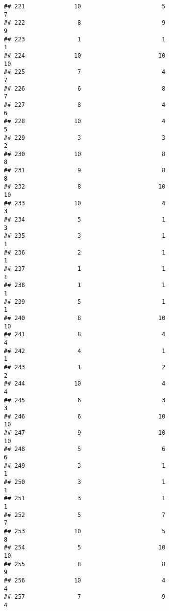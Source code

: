 \documentclass[
]{article}
\begin{document}
\begin{verbatim}
## 221              10                       5                        7
## 222               8                       9                        9
## 223               1                       1                        1
## 224              10                      10                       10
## 225               7                       4                        7
## 226               6                       8                        7
## 227               8                       4                        6
## 228              10                       4                        5
## 229               3                       3                        2
## 230              10                       8                        8
## 231               9                       8                        8
## 232               8                      10                       10
## 233              10                       4                        3
## 234               5                       1                        3
## 235               3                       1                        1
## 236               2                       1                        1
## 237               1                       1                        1
## 238               1                       1                        1
## 239               5                       1                        1
## 240               8                      10                       10
## 241               8                       4                        4
## 242               4                       1                        1
## 243               1                       2                        2
## 244              10                       4                        4
## 245               6                       3                        3
## 246               6                      10                       10
## 247               9                      10                       10
## 248               5                       6                        6
## 249               3                       1                        1
## 250               3                       1                        1
## 251               3                       1                        1
## 252               5                       7                        7
## 253              10                       5                        8
## 254               5                      10                       10
## 255               8                       8                        9
## 256              10                       4                        4
## 257               7                       9                        4

\end{verbatim}
\end{document}
